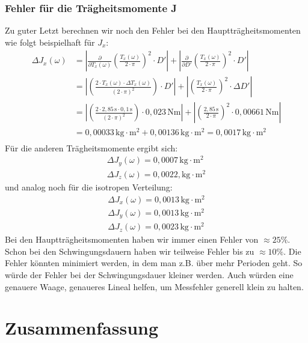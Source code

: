 \documentclass[fontsize=12pt]{scrartcl}
\begin{document}
\subsubsection{ Fehler für die Trägheitsmomente J}
Zu guter Letzt berechnen wir noch den Fehler bei den Hauptträgheitsmomenten wie folgt beispielhaft für $J_x$:
\begin{align*}
\Delta J_x(\omega) &=\left \vert  \frac{\partial}{\partial T_x(\omega) } \left(\frac{T_x(\omega)}{2 \cdot \pi }\right)^2 \cdot D' \right \vert
+ \left \vert  \frac{\partial}{\partial D' } \left(\frac{T_x(\omega)}{2 \cdot \pi }\right)^2 \cdot D' \right \vert \\
&=\left \vert  \left(\frac{2 \cdot T_x(\omega) \cdot \Delta T_x(\omega)}{(2 \cdot \pi)^2 }\right) \cdot D' \right \vert
+ \left \vert  \left(\frac{T_x(\omega)}{2 \cdot \pi }\right)^2 \cdot \Delta D' \right \vert \\
&=\left \vert  \left(\frac{2 \cdot 2,85\,\text{s} \cdot 0,1\,\text{s}}{(2 \cdot \pi)^2 }\right) \cdot 0,023\,\text{Nm} \right \vert
+ \left \vert  \left(\frac{2,85\,\text{s}}{2 \cdot \pi }\right)^2 \cdot  0,00661\,\text{Nm} \right \vert \\
&=0,00033\,\text{kg$\cdot$m$^2$} +0,00136\,\text{kg$\cdot$m$^2$} = 0,0017\,\text{kg$\cdot$m$^2$} \\
\end{align*}
Für die anderen Trägheitsmomente ergibt sich:
\begin{align*}
\Delta J_y(\omega)  = 0,0007\,\text{kg$\cdot$m$^2$} \\
\Delta J_z(\omega) = 0,0022,\text{kg$\cdot$m$^2$}
\end{align*}
\newpage
\noindent
und analog noch für die isotropen Verteilung:
\begin{align*}
\Delta J_x(\omega) = 0,0013\,\text{kg$\cdot$m$^2$} \\
\Delta J_y(\omega) = 0,0013\,\text{kg$\cdot$m$^2$} \\
\Delta J_z(\omega) = 0,0023\,\text{kg$\cdot$m$^2$}
\end{align*}
Bei den Hauptträgheitsmomenten haben wir immer einen Fehler von $\approx 25\%$. Schon bei den Schwingungsdauern haben wir teilweise Fehler bis zu $\approx 10\%$. Die Fehler könnten minimiert werden, in dem man z.B. über mehr Perioden geht. So würde der Fehler bei der Schwingungsdauer kleiner werden. Auch würden eine genauere Waage, genaueres Lineal helfen, um Messfehler generell klein zu halten.

\section{Zusammenfassung}
\end{document}
